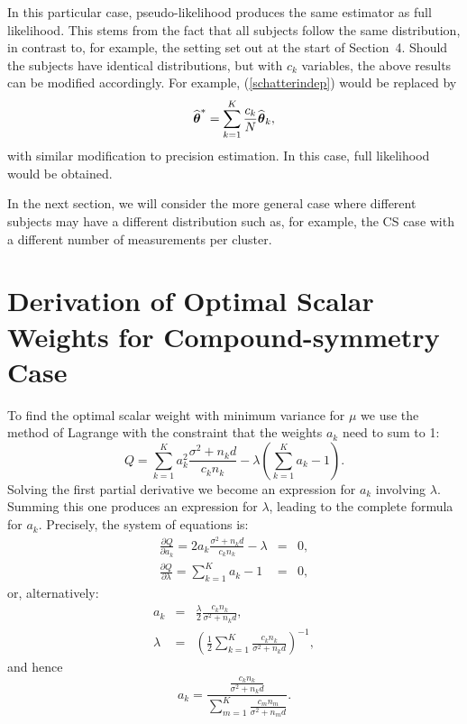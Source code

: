 \documentclass[11pt,a5paper,twoside]{book}
\newcommand{\bftheta}{\mbox{\boldmath $\theta$}}
\begin{document}
{{In this particular case, pseudo-likelihood produces the same 
estimator as full likelihood. This stems from the fact that 
all subjects follow the same distribution, in contrast to, 
for example, the setting set out at the start of Section~4.
Should the subjects have identical distributions, but with $c_k$ variables, 
the above results can be modified accordingly. For example, 
(\ref{schatterindep}) would be replaced by
$$
\widehat{\bftheta}^*=\sum_{k=1}^K\frac{c_k}{N}\widehat{\bftheta}_k,
$$
with similar modification to precision estimation. In this case, 
full likelihood would be obtained.

In the next section, we will consider the more general case where 
different subjects may have a different distribution such as, 
for example, 
the CS case with a different number of measurements 
per cluster.}

\setcounter{equation}{0}
\section[Optimal Scalar Weights for CS]{Derivation of Optimal Scalar Weights for Compound-symmetry Case}

To find the optimal scalar weight with minimum variance for $\mu$ we use the method of Lagrange with the constraint that the weights $a_k$ need to sum to 1:
\begin{equation}
Q=\sum_{k=1}^K a_k^2\frac{\sigma^2+n_k d}{c_kn_k}-\lambda\left(\sum_{k=1}^Ka_k-1\right).
\end{equation}
Solving the first partial derivative we become an expression for $a_k$ involving $\lambda$. Summing this one produces an expression for $\lambda$, leading to the complete formula for $a_k$. Precisely, the system of equations is:
\begin{eqnarray}
\frac{\partial Q}{\partial a_k}=2a_k\frac{\sigma^2+n_kd}{c_kn_k}-\lambda&=&0 ,\\
\frac{\partial Q}{\partial \lambda}= \sum_{k=1}^Ka_k-1&=&0,
\end{eqnarray}
or, alternatively:
\begin{eqnarray}
a_k&=&\frac{\lambda}{2}\frac{c_kn_k}{\sigma^2+n_k d},\\
\lambda&=& \left(\frac{1}{2} \sum_{k=1}^K \frac{c_kn_k}{\sigma^2+n_k d}\right)^{-1},
\end{eqnarray}
and hence
$$ a_k= \frac{\frac{c_kn_k}{\sigma^2+n_k d}}{\sum_{m=1}^K\frac{c_m n_m}{\sigma^2+n_m d}}
.$$

}
\end{document}

